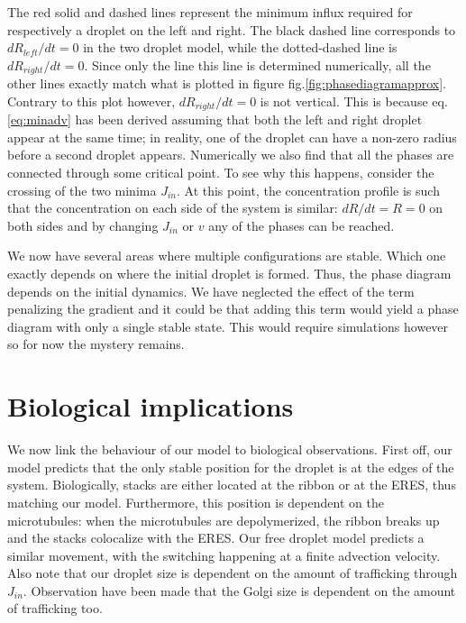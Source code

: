 \documentclass{Dissertate}
\begin{document}
The red solid and dashed lines represent the minimum influx required for
respectively a droplet on the left and right. The black dashed line
corresponds to \(dR_{left}/dt=0\) in the two droplet model, while the
dotted-dashed line is \(dR_{right}/dt=0\). Since only the line this line
is determined numerically, all the other lines exactly match what is
plotted in figure fig.\ref{fig:phasediagramapprox}. Contrary to this
plot however, \(dR_{right}/dt=0\) is not vertical. This is because
eq.\ref{eq:minadv} has been derived assuming that both the left and
right droplet appear at the same time; in reality, one of the droplet
can have a non-zero radius before a second droplet appears. Numerically
we also find that all the phases are connected through some critical
point. To see why this happens, consider the crossing of the two minima
\(J_{in}\). At this point, the concentration profile is such that the
concentration on each side of the system is similar: \(dR/dt=R=0\) on
both sides and by changing \(J_{in}\) or \(v\) any of the phases can be
reached.

We now have several areas where multiple configurations are stable.
Which one exactly depends on where the initial droplet is formed. Thus,
the phase diagram depends on the initial dynamics. We have neglected the
effect of the term penalizing the gradient and it could be that adding
this term would yield a phase diagram with only a single stable state.
This would require simulations however so for now the mystery remains.

\hypertarget{biological-implications}{%
\section{Biological implications}\label{biological-implications}}

We now link the behaviour of our model to biological observations. First
off, our model predicts that the only stable position for the droplet is
at the edges of the system. Biologically, stacks are either located at
the ribbon or at the ERES, thus matching our model. Furthermore, this
position is dependent on the microtubules: when the microtubules are
depolymerized, the ribbon breaks up and the stacks colocalize with the
ERES. Our free droplet model predicts a similar movement, with the
switching happening at a finite advection velocity. Also note that our
droplet size is dependent on the amount of trafficking through
\(J_{in}\). Observation have been made that the Golgi size is dependent
on the amount of trafficking too.
\end{document}

